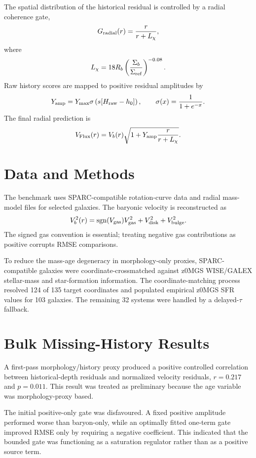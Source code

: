 \documentclass[11pt]{article}
\begin{document}
The spatial distribution of the historical residual is controlled by a radial coherence gate,
\begin{equation}
G_{\rm radial}(r)=\frac{r}{r+L_\chi},
\end{equation}
where
\begin{equation}
L_\chi=18R_b\left(\frac{\Sigma_b}{\Sigma_{\rm ref}}\right)^{-0.08}.
\end{equation}
Raw history scores are mapped to positive residual amplitudes by
\begin{equation}
Y_{\rm amp}=Y_{\max}\sigma\left(s[H_{\rm raw}-h_0]\right),\qquad \sigma(x)=\frac{1}{1+e^{-x}}.
\end{equation}
The final radial prediction is
\begin{equation}
V_{\rm Flux}(r)=V_b(r)\sqrt{1+Y_{\rm amp}\frac{r}{r+L_\chi}}.
\end{equation}

\section{Data and Methods}
The benchmark uses SPARC-compatible rotation-curve data and radial mass-model files for selected galaxies. The baryonic velocity is reconstructed as
\begin{equation}
V_b^2(r)=\mathrm{sgn}(V_{\rm gas})V_{\rm gas}^2+V_{\rm disk}^2+V_{\rm bulge}^2.
\end{equation}
The signed gas convention is essential; treating negative gas contributions as positive corrupts RMSE comparisons.

To reduce the mass-age degeneracy in morphology-only proxies, SPARC-compatible galaxies were coordinate-crossmatched against z0MGS WISE/GALEX stellar-mass and star-formation information. The coordinate-matching process resolved 124 of 135 target coordinates and populated empirical z0MGS SFR values for 103 galaxies. The remaining 32 systems were handled by a delayed-$\tau$ fallback.

\section{Bulk Missing-History Results}
A first-pass morphology/history proxy produced a positive controlled correlation between historical-depth residuals and normalized velocity residuals, $r=0.217$ and $p=0.011$. This result was treated as preliminary because the age variable was morphology-proxy based.

The initial positive-only gate was disfavoured. A fixed positive amplitude performed worse than baryon-only, while an optimally fitted one-term gate improved RMSE only by requiring a negative coefficient. This indicated that the bounded gate was functioning as a saturation regulator rather than as a positive source term.
\end{document}
